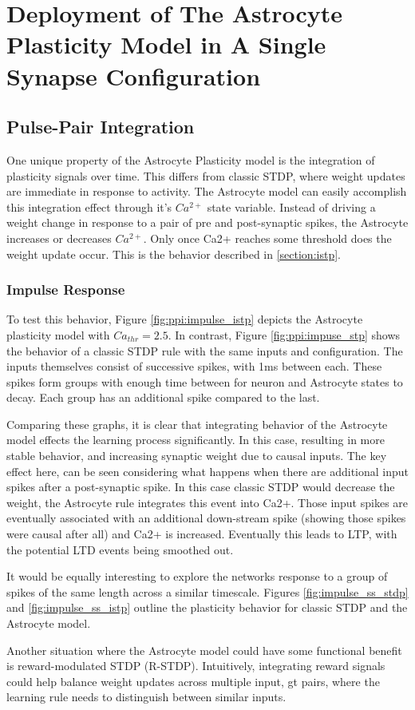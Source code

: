 \chapter{Deployment of The Astrocyte Plasticity Model in A Single Synapse
  Configuration} \label{chapter:obj2}

\section{Pulse-Pair Integration}
One unique property of the Astrocyte Plasticity model is the integration of
plasticity signals over time. This differs from classic STDP, where weight
updates are immediate in response to activity. The Astrocyte model can easily
accomplish this integration effect through it's $Ca^{2+}$ state
variable. Instead of driving a weight change in response to a pair of pre and
post-synaptic spikes, the Astrocyte increases or decreases $Ca^{2+}$. Only once Ca2+
reaches some threshold does the weight update occur. This is the behavior
described in \ref{section:istp}.

\subsection{Impulse Response}
To test this behavior, Figure \ref{fig:ppi:impulse_istp} depicts the Astrocyte
plasticity model with $Ca_{thr}=2.5$. In contrast, Figure
\ref{fig:ppi:impuse_stp} shows the behavior of a classic STDP rule with the same
inputs and configuration. The inputs themselves consist of successive spikes,
with 1ms between each. These spikes form groups with enough time between for
neuron and Astrocyte states to decay. Each group has an additional spike
compared to the last.

Comparing these graphs, it is clear that integrating
behavior of the Astrocyte model effects the learning process significantly. In
this case, resulting in more stable behavior, and increasing synaptic weight due
to causal inputs. The key effect here, can be seen considering what happens when
there are additional input spikes after a post-synaptic spike. In this case
classic STDP would decrease the weight, the Astrocyte rule integrates this event
into Ca2+. Those input spikes are eventually associated with an additional
down-stream spike (showing those spikes were causal after all) and Ca2+ is
increased. Eventually this leads to LTP, with the potential LTD events being
smoothed out.


It would be equally interesting to explore the networks response to a group of
spikes of the same length across a similar timescale. Figures
\ref{fig:impulse_ss_stdp} and \ref{fig:impulse_ss_istp} outline the plasticity
behavior for classic STDP and the Astrocyte model.




Another situation where the Astrocyte model could have some functional benefit
is reward-modulated STDP (R-STDP). Intuitively, integrating reward signals could
help balance weight updates across multiple input, gt pairs, where the learning
rule needs to distinguish between similar inputs.

